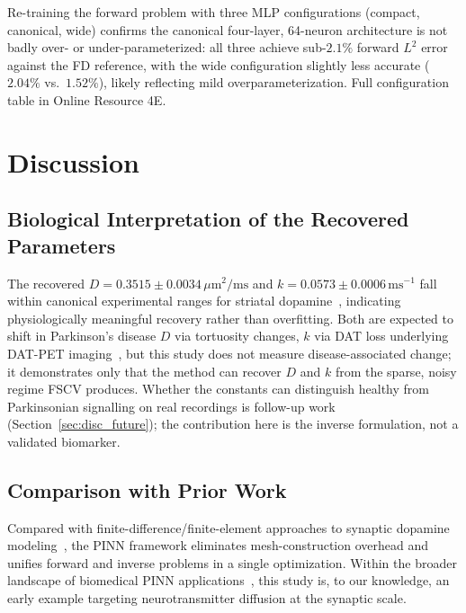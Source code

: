 \documentclass[pdflatex,sn-basic,Numbered]{sn-jnl}
\theoremstyle{thmstyleone}
\theoremstyle{thmstyletwo}
\begin{document}
Re-training the forward problem with three MLP configurations
(compact, canonical, wide) confirms the canonical four-layer,
64-neuron architecture is not badly over- or under-parameterized:
all three achieve sub-$2.1\%$ forward $L^2$ error against the FD
reference, with the wide configuration slightly less accurate
($2.04\%$ vs.\ $1.52\%$), likely reflecting mild
overparameterization. Full configuration table in Online
Resource 4E.

\section{Discussion}
\label{sec:discussion}

\subsection{Biological Interpretation of the Recovered Parameters}
\label{sec:disc_bio}

The recovered $D = 0.3515 \pm 0.0034\,\mu\text{m}^2/\text{ms}$
and $k = 0.0573 \pm 0.0006\,\text{ms}^{-1}$ fall within canonical
experimental ranges for striatal
dopamine~\cite{CraggRice2004, Nicholson1981, Rice2008},
indicating physiologically meaningful recovery rather than
overfitting. Both are expected to shift in Parkinson's disease
 $D$ via tortuosity changes, $k$ via DAT loss underlying
DAT-PET imaging~\cite{Rice2008, CraggRice2004}, but this study
does not measure disease-associated change; it demonstrates only
that the method can recover $D$ and $k$ from the sparse, noisy
regime FSCV produces. Whether the constants can distinguish
healthy from Parkinsonian signalling on real recordings is
follow-up work (Section~\ref{sec:disc_future}); the contribution
here is the inverse formulation, not a validated biomarker.

\subsection{Comparison with Prior Work}
\label{sec:disc_priorwork}

Compared with finite-difference/finite-element approaches to
synaptic dopamine modeling~\cite{Wiencke2020}, the PINN
framework eliminates mesh-construction overhead and unifies
forward and inverse problems in a single optimization. Within
the broader landscape of biomedical PINN
applications~\cite{Sahli2020, Yazdani2020, Haghighat2021}, this
study is, to our knowledge, an early example targeting
neurotransmitter diffusion at the synaptic scale.
\end{document}
